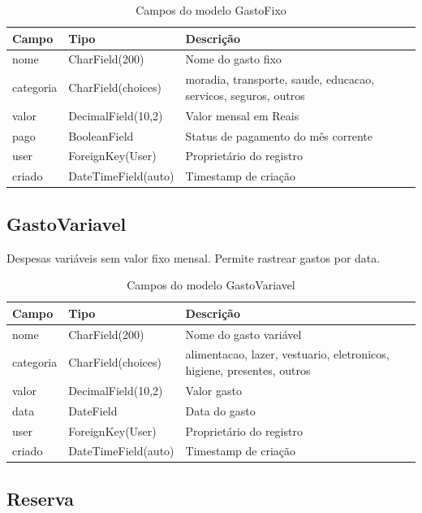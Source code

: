\documentclass[12pt, a4paper, oneside]{report}
\begin{document}
\begin{table}[H]
\centering
\caption{Campos do modelo GastoFixo}
\begin{tabularx}{\textwidth}{>{\ttfamily}l l X}
\toprule
Campo & Tipo & Descrição \\
\midrule
nome & CharField(200) & Nome do gasto fixo \\
categoria & CharField(choices) & moradia, transporte, saude, educacao, servicos, seguros, outros \\
valor & DecimalField(10,2) & Valor mensal em Reais \\
pago & BooleanField & Status de pagamento do mês corrente \\
user & ForeignKey(User) & Proprietário do registro \\
criado & DateTimeField(auto) & Timestamp de criação \\
\bottomrule
\end{tabularx}
\end{table}

\subsection{GastoVariavel}

Despesas variáveis sem valor fixo mensal. Permite rastrear gastos por data.

\begin{table}[H]
\centering
\caption{Campos do modelo GastoVariavel}
\begin{tabularx}{\textwidth}{>{\ttfamily}l l X}
\toprule
Campo & Tipo & Descrição \\
\midrule
nome & CharField(200) & Nome do gasto variável \\
categoria & CharField(choices) & alimentacao, lazer, vestuario, eletronicos, higiene, presentes, outros \\
valor & DecimalField(10,2) & Valor gasto \\
data & DateField & Data do gasto \\
user & ForeignKey(User) & Proprietário do registro \\
criado & DateTimeField(auto) & Timestamp de criação \\
\bottomrule
\end{tabularx}
\end{table}

\subsection{Reserva}
\end{document}
